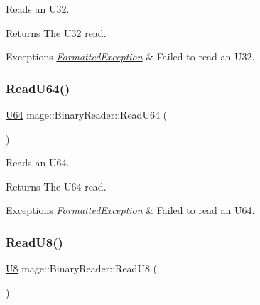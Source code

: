 Reads an {\ttfamily U32}.

\begin{DoxyReturn}{Returns}
The {\ttfamily U32} read. 
\end{DoxyReturn}

\begin{DoxyExceptions}{Exceptions}
{\em \hyperlink{classmage_1_1_formatted_exception}{Formatted\+Exception}} & Failed to read an {\ttfamily U32}. \\
\hline
\end{DoxyExceptions}
\hypertarget{classmage_1_1_binary_reader_ab702702eeb211d465026482bf25601d9}{}\label{classmage_1_1_binary_reader_ab702702eeb211d465026482bf25601d9} 
\subsubsection{\texorpdfstring{Read\+U64()}{ReadU64()}}
{\footnotesize\ttfamily \hyperlink{namespacemage_a6672cf3c861707ce4a3235a3eb43941d}{U64} mage\+::\+Binary\+Reader\+::\+Read\+U64 (\begin{DoxyParamCaption}{ }\end{DoxyParamCaption})\hspace{0.3cm}{\ttfamily [protected]}}

Reads an {\ttfamily U64}.

\begin{DoxyReturn}{Returns}
The {\ttfamily U64} read. 
\end{DoxyReturn}

\begin{DoxyExceptions}{Exceptions}
{\em \hyperlink{classmage_1_1_formatted_exception}{Formatted\+Exception}} & Failed to read an {\ttfamily U64}. \\
\hline
\end{DoxyExceptions}
\hypertarget{classmage_1_1_binary_reader_a913fdfead6b61b17ad2d2f9f54ccf057}{}\label{classmage_1_1_binary_reader_a913fdfead6b61b17ad2d2f9f54ccf057} 
\subsubsection{\texorpdfstring{Read\+U8()}{ReadU8()}}
{\footnotesize\ttfamily \hyperlink{namespacemage_afc638980bc6154f15af5e2d93a0e0ea9}{U8} mage\+::\+Binary\+Reader\+::\+Read\+U8 (\begin{DoxyParamCaption}{ }\end{DoxyParamCaption})\hspace{0.3cm}{\ttfamily [protected]}}

